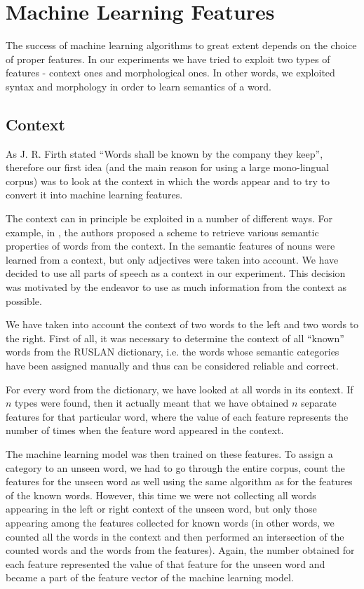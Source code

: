 \documentclass[letterpaper]{article}
\begin{document}
\section{Machine Learning Features}
The success of machine learning algorithms to great extent depends on the 
choice of proper 
features.
In our experiments we have tried to exploit two types of features 
- context ones and morphological ones. 
In other words, we exploited syntax and morphology in order to learn semantics of a word.  

\subsection{Context}
As J. R. Firth stated ``Words shall be known by the company they keep'',
therefore our first idea (and the main reason for using a large mono-lingual corpus) 
was to look at the context in which the words appear and to try to convert it into machine learning features.

The context can in principle be exploited in a number of different ways. For example,
in \cite{baroni:2009}, the authors proposed a scheme to retrieve
various semantic properties of words from the context.
In \cite{biemann05} the semantic features of nouns were learned
from a context, but only adjectives were taken into account.
We have decided to use all parts of speech as a context in our experiment. This decision was motivated by the endeavor to use as much information from the context as possible. 

We have taken into account the context of two words to the left and two words to the right. 
First of all, it was necessary to determine the context of all ``known'' words from the RUSLAN dictionary, i.e. the words whose semantic categories have been assigned manually and thus can be considered reliable and correct.  

For every word from the dictionary, we 
have looked at all words in its context.
If $n$ types were found, then it actually meant that we have obtained $n$ separate 
features for that particular word, where the value of each feature represents 
the number of times when the feature word appeared in the context.
 
The machine learning model was then trained on these features. To assign a category
to an unseen word, we had to go through the entire corpus, count
the features for the unseen word as well using the same algorithm as for the features of the known words. However, this time we were not collecting all words appearing in the left or right context of the unseen word, but only those appearing among the features collected for known words (in other words, we counted all the words in the context and then performed an 
intersection of the counted words and the words from the features). Again, the number obtained for each feature represented the value of that feature for the unseen word and became a part of the feature vector of the machine learning model.
\end{document}
